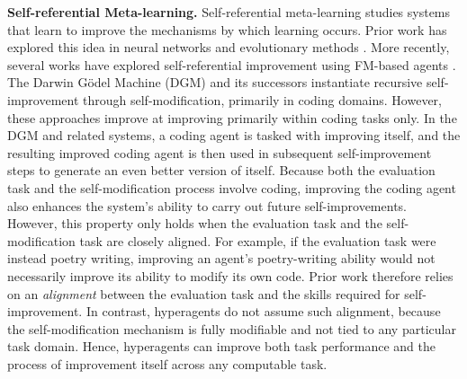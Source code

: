 \documentclass{article}
\begin{document}
\textbf{Self-referential Meta-learning.}
Self-referential meta-learning studies systems that learn to improve the mechanisms by which learning occurs. Prior work has explored this idea in neural networks \citep{kirsch2022eliminating, jackson2024discovering} and evolutionary methods \citep{lu2023arbitrary}. More recently, several works have explored self-referential improvement using FM-based agents \citep{zelikman2024self, robeyns2025self, yin2025godel, zhang2025darwin}. The Darwin G\"odel Machine (DGM) \citep{zhang2025darwin} and its successors \citep{wang2025huxley, xia2025live, weng2026group} instantiate recursive self-improvement through self-modification, primarily in coding domains. However, these approaches improve at improving primarily within coding tasks only.
In the DGM and related systems, a coding agent is tasked with improving itself, and the resulting improved coding agent is then used in subsequent self-improvement steps to generate an even better version of itself. Because both the evaluation task and the self-modification process involve coding, improving the coding agent also enhances the system's ability to carry out future self-improvements. However, this property only holds when the evaluation task and the self-modification task are closely aligned. For example, if the evaluation task were instead poetry writing, improving an agent's poetry-writing ability would not necessarily improve its ability to modify its own code. Prior work therefore relies on an \emph{alignment} between the evaluation task and the skills required for self-improvement. In contrast, hyperagents do not assume such alignment, because the self-modification mechanism is fully modifiable and not tied to any particular task domain. Hence, hyperagents can improve both task performance and the process of improvement itself across any computable task.

\end{document}
